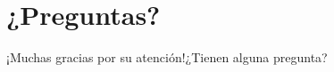 \section*{¿Preguntas?}
{
\sectionheaderWhite 

\begin{frame}{¡Muchas gracias por su atención!}{¿Tienen alguna pregunta?}
\end{frame}

}